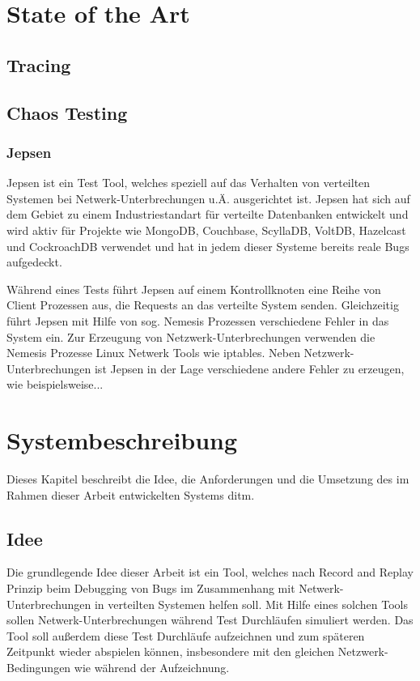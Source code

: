 \documentclass[a4paper]{report}
\begin{document}
\chapter{State of the Art}
\cite{debugging_distributed_systems_2016}
\section{Tracing}
\section{Chaos Testing}
\cite{why_is_random_testing_effective}
\subsection{Jepsen}
\cite{abstracting_the_geniuses}

Jepsen ist ein Test Tool, welches speziell auf das Verhalten von verteilten Systemen bei Netwerk-Unterbrechungen u.Ä. ausgerichtet ist.
Jepsen hat sich auf dem Gebiet zu einem Industriestandart für verteilte Datenbanken entwickelt und wird aktiv für Projekte wie
MongoDB, Couchbase, ScyllaDB, VoltDB, Hazelcast und CockroachDB verwendet und hat in jedem dieser Systeme bereits reale Bugs aufgedeckt.

Während eines Tests führt Jepsen auf einem Kontrollknoten eine Reihe von Client Prozessen aus, die Requests an das verteilte System
senden. Gleichzeitig führt Jepsen mit Hilfe von sog. Nemesis Prozessen verschiedene Fehler in das System ein. Zur Erzeugung von
Netzwerk-Unterbrechungen verwenden die Nemesis Prozesse Linux Netwerk Tools wie iptables. Neben Netzwerk-Unterbrechungen ist Jepsen in
der Lage verschiedene andere Fehler zu erzeugen, wie beispielsweise...


\chapter{Systembeschreibung}
Dieses Kapitel beschreibt die Idee, die Anforderungen und die Umsetzung des im Rahmen dieser Arbeit entwickelten Systems ditm.
\section{Idee}
Die grundlegende Idee dieser Arbeit ist ein Tool, welches nach Record and Replay Prinzip beim Debugging von Bugs im Zusammenhang
mit Netwerk-Unterbrechungen in verteilten Systemen helfen soll. Mit Hilfe eines solchen Tools sollen Netwerk-Unterbrechungen
während Test Durchläufen simuliert werden. Das Tool soll außerdem diese Test Durchläufe aufzeichnen und zum späteren Zeitpunkt
wieder abspielen können, insbesondere mit den gleichen Netzwerk-Bedingungen wie während der Aufzeichnung.
\end{document}
